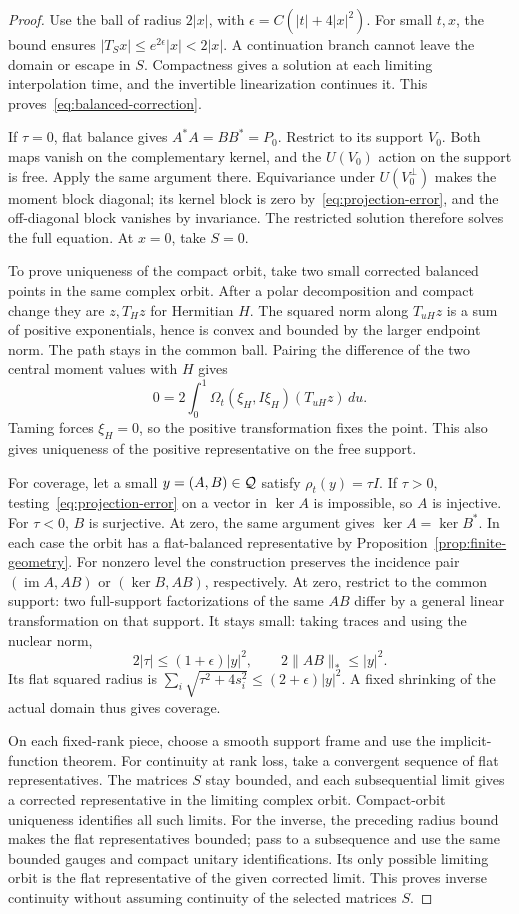 \begin{proof}
Use the ball of radius $2|x|$, with
$\epsilon=C(|t|+4|x|^2)$. For small $t,x$, the bound ensures
$|T_Sx|\le e^{2\epsilon}|x|<2|x|$. A continuation branch cannot
leave the domain or escape in $S$. Compactness gives a solution at
each limiting interpolation time, and the invertible linearization
continues it. This proves~\eqref{eq:balanced-correction}.

If $\tau=0$, flat balance gives $A^*A=BB^*=P_0$. Restrict to its
support $V_0$. Both maps vanish on the complementary kernel, and
the $U(V_0)$ action on the support is free. Apply the same argument
there. Equivariance under $U(V_0^\perp)$ makes the moment block
diagonal; its kernel block is zero by~\eqref{eq:projection-error},
and the off-diagonal block vanishes by invariance. The restricted
solution therefore solves the full equation. At $x=0$, take $S=0$.

To prove uniqueness of the compact orbit, take two small corrected
balanced points in the same complex orbit. After a polar decomposition
and compact change they are $z,T_Hz$ for Hermitian $H$. The squared
norm along $T_{uH}z$ is a sum of positive exponentials, hence is
convex and bounded by the larger endpoint norm. The path stays in
the common ball. Pairing the difference of the two central moment
values with $H$ gives
\[
0=2\int_0^1\Omega_t(\xi_H,I\xi_H)(T_{uH}z)\,du.
\]
Taming forces $\xi_H=0$, so the positive transformation fixes the
point. This also gives uniqueness of the positive representative
on the free support.

For coverage, let a small $y=(A,B)\in\mathcal Q$ satisfy
$\rho_t(y)=\tau I$. If $\tau>0$, testing~\eqref{eq:projection-error}
on a vector in $\ker A$ is impossible, so $A$ is injective.
For $\tau<0$, $B$ is surjective. At zero, the same argument gives
$\ker A=\ker B^*$. In each case the orbit has a flat-balanced
representative by Proposition~\ref{prop:finite-geometry}.
For nonzero level the construction preserves the incidence pair
$(\operatorname{im}A,AB)$ or $(\ker B,AB)$, respectively. At zero,
restrict to the common support: two full-support factorizations of
the same $AB$ differ by a general linear transformation on that support.
It stays small: taking traces and using the nuclear norm,
\[
2|\tau|\le(1+\epsilon)|y|^2,\qquad
2\|AB\|_*\le|y|^2.
\]
Its flat squared radius is
$\sum_i\sqrt{\tau^2+4s_i^2}\le(2+\epsilon)|y|^2$.
A fixed shrinking of the actual domain thus gives coverage.

On each fixed-rank piece, choose a smooth support frame and use the
implicit-function theorem. For continuity at rank loss, take a
convergent sequence of flat representatives. The matrices $S$ stay
bounded, and each subsequential limit gives a corrected representative
in the limiting complex orbit. Compact-orbit uniqueness identifies
all such limits. For the inverse, the preceding radius bound makes
the flat representatives bounded; pass to a subsequence and use the
same bounded gauges and compact unitary identifications. Its only
possible limiting orbit is the flat representative of the given
corrected limit. This proves inverse continuity without assuming
continuity of the selected matrices $S$.
\end{proof}

